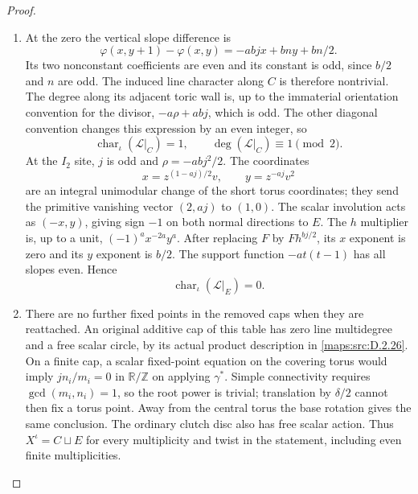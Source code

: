 \begin{proof}
\begin{enumerate}[label=\arabic*.,leftmargin=*]
\item At the zero the vertical slope difference is
\[
 \varphi(x,y+1)-\varphi(x,y)=-abjx+bny+bn/2.
\]
Its two nonconstant coefficients are even and its constant is odd,
since $b/2$ and $n$ are odd. The induced line character along $C$
is therefore nontrivial. The degree along its adjacent toric wall is,
up to the immaterial orientation convention for the divisor,
$-a\rho+abj$, which is odd. The other diagonal convention changes
this expression by an even integer, so
\[
 \operatorname{char}_{\iota}(\mathcal L|_C)=1,
          \qquad \deg(\mathcal L|_C)\equiv1\pmod2.            \tag{D.C212}\label{maps:eq:D.C212}
\]
At the $I_2$ site, $j$ is odd and $\rho=-abj^2/2$. The coordinates
\[
 x=z^{(1-aj)/2}v,\qquad y=z^{-aj}v^2
\]
are an integral unimodular change of the short torus coordinates;
they send the primitive vanishing vector $(2,aj)$ to $(1,0)$.
The scalar involution acts as $(-x,y)$, giving sign $-1$ on both
normal directions to $E$. The $h$ multiplier is, up to a unit,
$(-1)^a x^{-2a}y^a$. After replacing $F$ by $Fh^{bj/2}$, its
$x$ exponent is zero and its $y$ exponent is $b/2$. The support
function $-at(t-1)$ has all slopes even. Hence
\[
                 \operatorname{char}_{\iota}(\mathcal L|_E)=0.
                                                               \tag{D.C213}\label{maps:eq:D.C213}
\]

\item There are no further fixed points in the removed caps when they are
reattached. An original additive cap of this table has zero line
multidegree and a free scalar circle, by its actual product description
in \ref{maps:src:D.2.26}. On a finite cap, a scalar fixed-point equation on the covering
torus would imply $jn_i/m_i=0$ in $\mathbb R/\mathbb Z$ on applying
$\gamma^*$. Simple connectivity requires $\gcd(m_i,n_i)=1$, so the
root power is trivial; translation by $\delta/2$ cannot then fix a
torus point. Away from the central torus the base rotation gives the
same conclusion. The ordinary clutch disc also has free scalar action.
Thus $X^{\iota}=C\sqcup E$ for every multiplicity and twist in the
statement, including even finite multiplicities.


\end{enumerate}
\end{proof}

